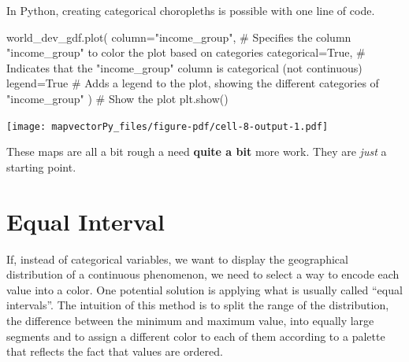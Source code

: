 \documentclass[
  letterpaper,
  DIV=11,
  numbers=noendperiod]{scrreprt}
\newenvironment{Shaded}{\begin{snugshade}}{\end{snugshade}}
\newcommand{\CommentTok}[1]{\textcolor[rgb]{0.37,0.37,0.37}{#1}}
\newcommand{\NormalTok}[1]{\textcolor[rgb]{0.00,0.23,0.31}{#1}}
\newcommand{\OperatorTok}[1]{\textcolor[rgb]{0.37,0.37,0.37}{#1}}
\newcommand{\StringTok}[1]{\textcolor[rgb]{0.13,0.47,0.30}{#1}}
\newcommand{\VariableTok}[1]{\textcolor[rgb]{0.07,0.07,0.07}{#1}}
\begin{document}
In Python, creating categorical choropleths is possible with one line of
code.

\begin{Shaded}
\begin{Highlighting}[]
\NormalTok{world\_dev\_gdf.plot(}
\NormalTok{    column}\OperatorTok{=}\StringTok{"income\_group"}\NormalTok{,  }\CommentTok{\# Specifies the column "income\_group" to color the plot based on categories}
\NormalTok{    categorical}\OperatorTok{=}\VariableTok{True}\NormalTok{,       }\CommentTok{\# Indicates that the "income\_group" column is categorical (not continuous)}
\NormalTok{    legend}\OperatorTok{=}\VariableTok{True}             \CommentTok{\# Adds a legend to the plot, showing the different categories of "income\_group"}
\NormalTok{)}
\CommentTok{\# Show the plot}
\NormalTok{plt.show()}
\end{Highlighting}
\end{Shaded}

\texttt{[image: mapvectorPy\_files/figure-pdf/cell-8-output-1.pdf]}

\begin{tcolorbox}[enhanced jigsaw, breakable, toptitle=1mm, titlerule=0mm, opacityback=0, colback=white, coltitle=black, leftrule=.75mm, bottomtitle=1mm, colframe=quarto-callout-important-color-frame, colbacktitle=quarto-callout-important-color!10!white, toprule=.15mm, bottomrule=.15mm, arc=.35mm, rightrule=.15mm, opacitybacktitle=0.6, title=\textcolor{quarto-callout-important-color}{\faExclamation}\hspace{0.5em}{Important}, left=2mm]

These maps are all a bit rough a need \textbf{quite a bit} more work.
They are \emph{just} a starting point.

\end{tcolorbox}

\section*{Equal Interval}\label{equal-interval}


If, instead of categorical variables, we want to display the
geographical distribution of a continuous phenomenon, we need to select
a way to encode each value into a color. One potential solution is
applying what is usually called ``equal intervals''. The intuition of
this method is to split the range of the distribution, the difference
between the minimum and maximum value, into equally large segments and
to assign a different color to each of them according to a palette that
reflects the fact that values are ordered.
\end{document}
